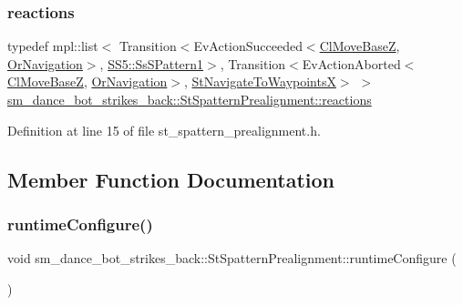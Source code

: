 \subsubsection{\texorpdfstring{reactions}{reactions}}
{\footnotesize\ttfamily typedef mpl\+::list$<$ Transition$<$Ev\+Action\+Succeeded$<$\hyperlink{classcl__move__base__z_1_1ClMoveBaseZ}{Cl\+Move\+BaseZ}, \hyperlink{classsm__dance__bot__strikes__back_1_1OrNavigation}{Or\+Navigation}$>$, \hyperlink{structsm__dance__bot__strikes__back_1_1SS5_1_1SsSPattern1}{S\+S5\+::\+Ss\+S\+Pattern1}$>$, Transition$<$Ev\+Action\+Aborted$<$\hyperlink{classcl__move__base__z_1_1ClMoveBaseZ}{Cl\+Move\+BaseZ}, \hyperlink{classsm__dance__bot__strikes__back_1_1OrNavigation}{Or\+Navigation}$>$, \hyperlink{structsm__dance__bot__strikes__back_1_1StNavigateToWaypointsX}{St\+Navigate\+To\+WaypointsX}$>$ $>$ \hyperlink{structsm__dance__bot__strikes__back_1_1StSpatternPrealignment_ac474c30f4538ff38707a3ce571a635a0}{sm\+\_\+dance\+\_\+bot\+\_\+strikes\+\_\+back\+::\+St\+Spattern\+Prealignment\+::reactions}}



Definition at line 15 of file st\+\_\+spattern\+\_\+prealignment.\+h.



\subsection{Member Function Documentation}
\mbox{\label{structsm__dance__bot__strikes__back_1_1StSpatternPrealignment_ad9edd102ef86322d26c9c03a757805b3}} 
\subsubsection{\texorpdfstring{runtime\+Configure()}{runtimeConfigure()}}
{\footnotesize\ttfamily void sm\+\_\+dance\+\_\+bot\+\_\+strikes\+\_\+back\+::\+St\+Spattern\+Prealignment\+::runtime\+Configure (\begin{DoxyParamCaption}{ }\end{DoxyParamCaption})\hspace{0.3cm}{\ttfamily [inline]}}



